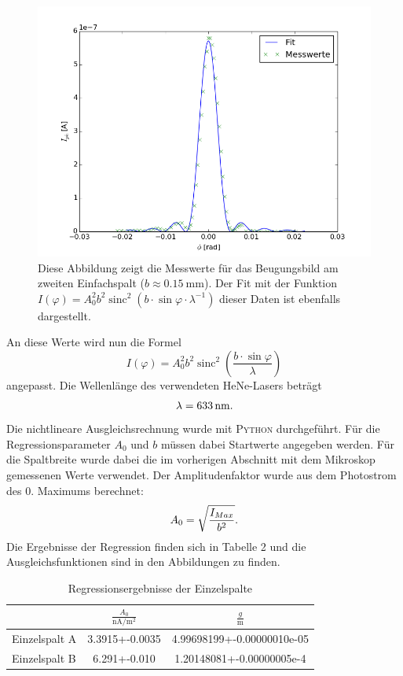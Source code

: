 \documentclass[11pt,ngerman,a4paper]{article}
\begin{document}
\begin{figure}[H]
\centering
\includegraphics[scale=0.8]{plot1.png}
\caption{Diese Abbildung zeigt die Messwerte für das Beugungsbild am zweiten Einfachspalt ($b \approx \SI{0.15}{\milli\meter}$). Der Fit mit der Funktion $I(\varphi) = A_0^2b^2\operatorname{sinc}^2(b\cdot\sin\varphi\cdot\lambda^{-1})$  dieser Daten ist ebenfalls dargestellt.}
\label{plot1}
\end{figure}

\noindent
An diese Werte wird nun die Formel
\begin{equation}
I(\varphi) = A_0^2b^2\operatorname{sinc}^2\left( \frac{b\cdot\sin{\varphi}}{\lambda}\right)
\end{equation}
angepasst. Die Wellenlänge des verwendeten HeNe-Lasers beträgt
\[
\lambda = \SI{633}{\nano\meter}\rm.
\]
Die nichtlineare Ausgleichsrechnung wurde mit \textsc{Python} durchgeführt. Für die Regressionsparameter $A_0$ und $b$ müssen dabei Startwerte angegeben werden. Für die Spaltbreite wurde dabei die im vorherigen Abschnitt mit dem Mikroskop gemessenen Werte verwendet. Der Amplitudenfaktor wurde aus dem Photostrom des 0. Maximums berechnet:
\[
A_0= \sqrt{\frac{I_{Max}}{b^2}}\rm.
\]
Die Ergebnisse der Regression finden sich in Tabelle 2 und die Ausgleichsfunktionen sind in den Abbildungen zu finden.
\begin{table}[H]
\centering
{}
\begin{tabular}{lSS}
\toprule
&$\frac{A_0}{\si{\nano\ampere\per\meter\squared}}$ &$\frac{g}{\si{\meter}}$\\
\midrule
Einzelspalt A & 3.3915+-0.0035 & 4.99698199+-0.00000010e-05 \\
Einzelspalt B & 6.291+-0.010 & 1.20148081+-0.00000005e-4\\
\bottomrule
\end{tabular}
\caption{Regressionsergebnisse der Einzelspalte}
\end{table}
\end{document}
